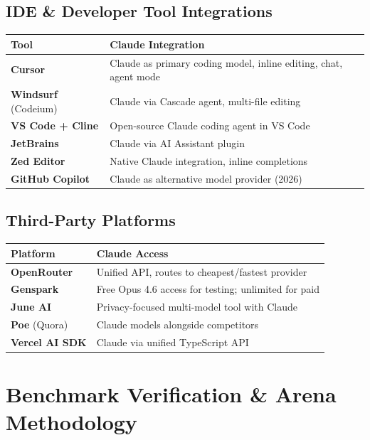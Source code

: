 \documentclass[11pt,a4paper]{article}
\begin{document}
\subsection{IDE \& Developer Tool Integrations}

\begin{center}
\begin{tabular}{lL{9cm}}
\toprule
\textbf{Tool} & \textbf{Claude Integration} \\
\midrule
\textbf{Cursor} & Claude as primary coding model, inline editing, chat, agent mode \\
\textbf{Windsurf} (Codeium) & Claude via Cascade agent, multi-file editing \\
\textbf{VS Code + Cline} & Open-source Claude coding agent in VS Code \\
\textbf{JetBrains} & Claude via AI Assistant plugin \\
\textbf{Zed Editor} & Native Claude integration, inline completions \\
\textbf{GitHub Copilot} & Claude as alternative model provider (2026) \\
\bottomrule
\end{tabular}
\end{center}

\subsection{Third-Party Platforms}

\begin{center}
\begin{tabular}{lL{9cm}}
\toprule
\textbf{Platform} & \textbf{Claude Access} \\
\midrule
\textbf{OpenRouter} & Unified API, routes to cheapest/fastest provider \\
\textbf{Genspark} & Free Opus 4.6 access for testing; unlimited for paid \\
\textbf{June AI} & Privacy-focused multi-model tool with Claude \\
\textbf{Poe} (Quora) & Claude models alongside competitors \\
\textbf{Vercel AI SDK} & Claude via unified TypeScript API \\
\bottomrule
\end{tabular}
\end{center}

\section{Benchmark Verification \& Arena Methodology}
\end{document}
